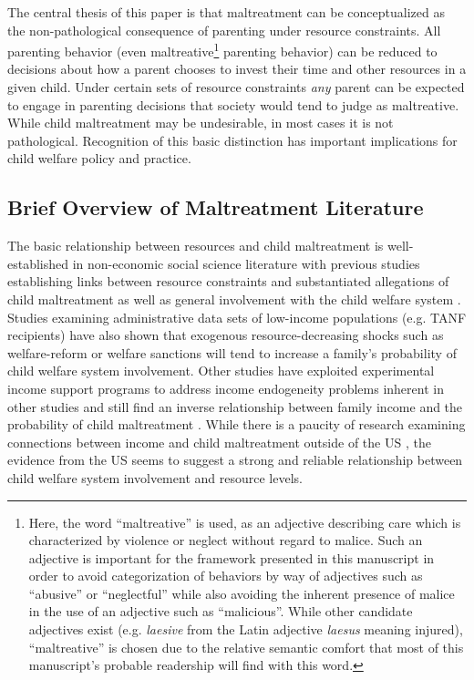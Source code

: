The central thesis of this paper is that maltreatment can be conceptualized as the non-pathological consequence of parenting under resource constraints. All parenting behavior (even maltreative\footnote{Here, the word ``maltreative'' is used, as an adjective describing care which is characterized by violence or neglect without regard to malice. Such an adjective is important for the framework presented in this manuscript in order to avoid categorization of behaviors by way of adjectives such as ``abusive'' or ``neglectful'' while also avoiding the inherent presence of malice in the use of an adjective such as ``malicious''. While other candidate adjectives exist (e.g. \emph{laesive} from the Latin adjective \emph{laesus} meaning injured), ``maltreative'' is chosen due to the relative semantic comfort that most of this manuscript's probable readership will find with this word.} parenting behavior) can be reduced to decisions about how a parent chooses to invest their time and other resources in a given child. Under certain sets of resource constraints \emph{any} parent can be expected to engage in parenting decisions that society would tend to judge as maltreative. While child maltreatment may be undesirable, in most cases it is not pathological. Recognition of this basic distinction has important implications for child welfare policy and practice.

\subsection{Brief Overview of Maltreatment Literature}

The basic relationship between resources and child maltreatment is well-established in non-economic social science literature with previous studies establishing links between resource constraints and substantiated allegations of child maltreatment as well as general involvement with the child welfare system \citep{Gil1970, Pelton1981, Pelton1994, Russell1984, Sedlak1996, Stith2009, BergerAndWoldfogel2004}. Studies examining administrative data sets of low-income populations (e.g. TANF recipients) have also shown that exogenous resource-decreasing shocks such as welfare-reform \citep{Courtney2005} or welfare sanctions \citep{Slack2007} will tend to increase a family's probability of child welfare system involvement. Other studies have exploited experimental income support programs to address income endogeneity problems inherent in other studies and still find an inverse relationship between family income and the probability of child maltreatment \citep{Cancian2013, Fein2003}. While there is a paucity of research examining connections between income and child maltreatment outside of the US \citep{Cameron2006}, the evidence from the US seems to suggest a strong and reliable relationship between child welfare system involvement and resource levels. 

